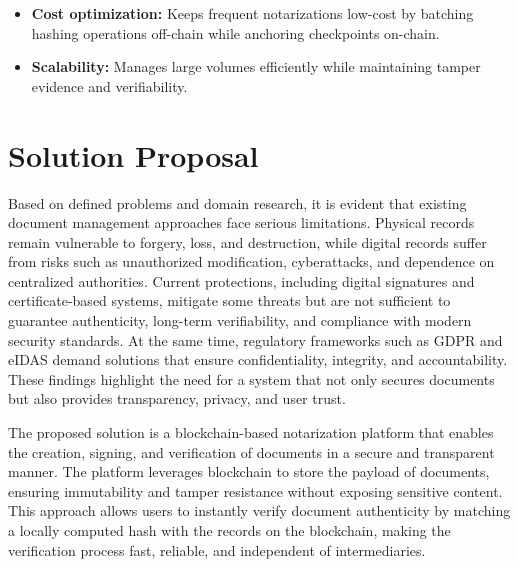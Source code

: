\begin{itemize}
    \item \textbf{Cost optimization:} Keeps frequent notarizations low-cost by batching hashing operations off-chain while anchoring checkpoints on-chain.
    \item \textbf{Scalability:} Manages large volumes efficiently while maintaining tamper evidence and verifiability.
\end{itemize}


\chapter{Solution Proposal}
Based on defined problems and domain research, it is evident that existing document management approaches face serious limitations. Physical records remain vulnerable to forgery, loss, and destruction, while digital records suffer from risks such as unauthorized modification, cyberattacks, and dependence on centralized authorities. Current protections, including digital signatures and certificate-based systems, mitigate some threats but are not sufficient to guarantee authenticity, long-term verifiability, and compliance with modern security standards. At the same time, regulatory frameworks such as GDPR and eIDAS demand solutions that ensure confidentiality, integrity, and accountability. These findings highlight the need for a system that not only secures documents but also provides transparency, privacy, and user trust.

The proposed solution is a blockchain-based notarization platform that enables the creation, signing, and verification of documents in a secure and transparent manner. The platform leverages blockchain to store the payload of documents, ensuring immutability and tamper resistance without exposing sensitive content. This approach allows users to instantly verify document authenticity by matching a locally computed hash with the records on the blockchain, making the verification process fast, reliable, and independent of intermediaries.


